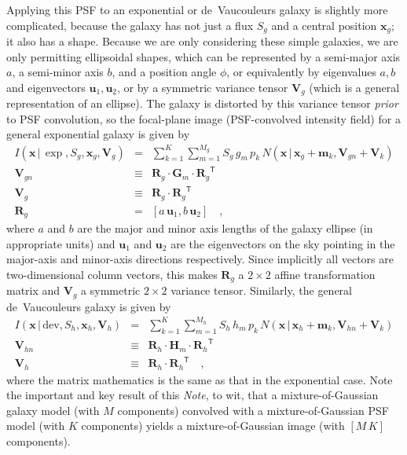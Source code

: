 \documentclass[12pt,pdftex,preprint]{aastex}
\newcommand{\documentname}{\textsl{Note}}
\newcommand{\tmatrix}[1]{\boldsymbol{#1}}
\newcommand{\transpose}[1]{{#1}^{\mathsf T}}
\newcommand{\tvector}[1]{\boldsymbol{#1}}
\newcommand{\pos}{\tvector{x}}
\newcommand{\mean}{\tvector{m}}
\newcommand{\var}{\tmatrix{V}\!}
\newcommand{\Gm}{\tmatrix{G}}
\newcommand{\Hm}{\tmatrix{H}}
\newcommand{\affine}{\tmatrix{R}}
\newcommand{\uv}{\tvector{u}}
\newcommand{\normal}{N}
\newcommand{\given}{\,|\,}
\newcommand{\dev}{\mathrm{dev}}
\begin{document}
Applying this PSF to an exponential or de~Vaucouleurs galaxy is
slightly more complicated, because the galaxy has not just a flux
$S_g$ and a central position $\pos_g$; it also has a shape.  Because
we are only considering these simple galaxies, we are only permitting
ellipsoidal shapes, which can be represented by a semi-major axis $a$,
a semi-minor axis $b$, and a position angle $\phi$, or equivalently by
eigenvalues $a, b$ and eigenvectors $\uv_1, \uv_2$, or by a symmetric
variance tensor $\var_g$ (which is a general representation of an
ellipse).  The galaxy is distorted by this variance tensor
\emph{prior} to PSF convolution, so the focal-plane image
(PSF-convolved intensity field) for a general exponential galaxy is
given by
\begin{eqnarray}\displaystyle
I(\pos\given\exp,S_g,\pos_g,\var_g) &=& \sum_{k=1}^K \sum_{m=1}^{M_g} S_g\,g_m\,p_k\,\normal(\pos\given\pos_g+\mean_k,\var_{gn}+\var_k)
\\
\var_{gn} &\equiv& \affine_g\cdot\Gm_m\cdot\transpose{\affine_g}
\\
\var_g &\equiv& \affine_g\cdot\transpose{\affine_g}
\\
\affine_g &=& \left[a\,\uv_1 , b\,\uv_2 \right]
\quad ,
\end{eqnarray}
where $a$ and $b$ are the major and minor axis lengths of the galaxy
ellipse (in appropriate units) and $\uv_1$ and $\uv_2$ are the
eigenvectors on the sky pointing in the major-axis and minor-axis
directions respectively.  Since implicitly all vectors are
two-dimensional column vectors, this makes $\affine_g$ a $2\times 2$
affine transformation matrix and $\var_g$ a symmetric $2\times 2$
variance tensor.  Similarly, the general de~Vaucouleurs galaxy is
given by
\begin{eqnarray}\displaystyle
I(\pos\given\dev,S_h,\pos_h,\var_h) &=& \sum_{k=1}^K \sum_{m=1}^{M_h} S_h\,h_m\,p_k\,\normal(\pos\given\pos_h+\mean_k,\var_{hn}+\var_k)
\\
\var_{hn} &\equiv& \affine_h\cdot\Hm_m\cdot\transpose{\affine_h}
\\
\var_h &\equiv& \affine_h\cdot\transpose{\affine_h}
\quad ,
\end{eqnarray}
where the matrix mathematics is the same as that in the exponential
case.  Note the important and key result of this \documentname, to
wit, that a mixture-of-Gaussian galaxy model (with $M$ components)
convolved with a mixture-of-Gaussian PSF model (with $K$ components)
yields a mixture-of-Gaussian image (with $[M\,K]$ components).
\end{document}

